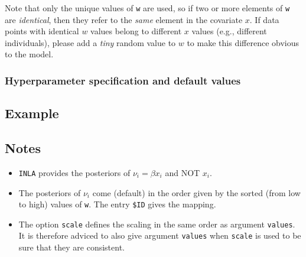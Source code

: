 \documentclass[a4paper,11pt]{article}
\begin{document}
Note that only the unique values of \texttt{w} are used, so if two or
more elements of \texttt{w} are \emph{identical}, then they refer to
the \emph{same} element in the covariate $x$. If data points with identical $w$ values belong to different $x$ values (e.g., different individuals), please add a \emph{tiny} random value to $w$ to make this difference obvious to the model.


\subsubsection*{Hyperparameter specification and default values}


\subsection*{Example}



\subsection*{Notes}

\begin{itemize}
\item \texttt{INLA} provides the posteriors of $\nu_i=\beta x_i$ and NOT $x_i$.
\item The posteriors of $\nu_i$ come (default) in the order given by the sorted
(from low to high) values of \texttt{w}. The entry \verb|$ID|
gives the mapping.
\item The option \verb|scale| defines the scaling in the same order as
argument \verb|values|. It is therefore adviced to also give
argument \verb|values| when \verb|scale| is used to be sure that
they are consistent.
\end{itemize}
\end{document}
